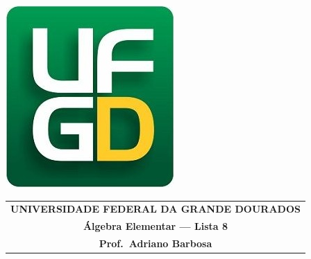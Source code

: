 \documentclass[a4paper,5pt]{amsbook}
\begin{document}
\thispagestyle{empty}
\pagestyle{empty}
\begin{minipage}[h]{0.14\textwidth}
	\includegraphics[scale=0.24]{../ufgd.png}
\end{minipage}
\begin{minipage}[h]{\textwidth}
\begin{tabular}{c}
{{\bf UNIVERSIDADE FEDERAL DA GRANDE DOURADOS}}\\
{{\bf \'Algebra Elementar --- Lista 8}}\\
{{\bf Prof.\ Adriano Barbosa}}\\
\end{tabular}
\vspace{-0.45cm}
%
\end{minipage}

\end{document}
